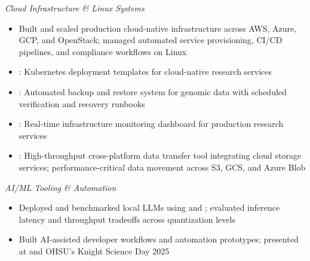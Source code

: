 \vspace{1em}

\emph{Cloud Infrastructure \& Linux Systems}

\begin{itemize}
    \item Built and scaled production cloud-native infrastructure across AWS, Azure, GCP, and OpenStack; managed automated service provisioning, CI/CD pipelines, and compliance workflows on Linux
    \item {}: Kubernetes deployment templates for cloud-native research services
    \item {}: Automated backup and restore system for genomic data with scheduled verification and recovery runbooks
    \item {}: Real-time infrastructure monitoring dashboard for production research services
    \item {}: High-throughput cross-platform data transfer tool integrating cloud storage services; performance-critical data movement across S3, GCS, and Azure Blob
\end{itemize}

\vspace{1em}

\emph{AI/ML Tooling \& Automation}

\begin{itemize}
    \item Deployed and benchmarked local LLMs using  and ; evaluated inference latency and throughput tradeoffs across quantization levels
    \item Built AI-assisted developer workflows and automation prototypes; presented at  and OHSU's Knight Science Day 2025
\end{itemize}

\newpage

\vspace*{\baselineskip}




\vfill \myBreak{}


